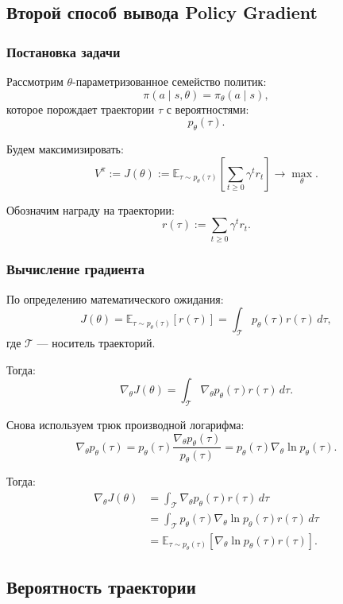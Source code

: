 \documentclass[12pt,a4paper]{article}
\begin{document}
\subsection{Второй способ вывода Policy Gradient}

\subsubsection{Постановка задачи}

Рассмотрим $\theta$-параметризованное семейство политик:
\[
\pi(a\mid s,\theta)
=
\pi_\theta(a\mid s),
\]
которое порождает траектории $\tau$ с вероятностями:
\[
p_\theta(\tau).
\]

Будем максимизировать:
\[
V^\pi
:=
J(\theta)
:=
\mathbb E_{\tau\sim p_\theta(\tau)}
\left[
\sum_{t\ge 0}
\gamma^t r_t
\right]
\to
\max_\theta.
\]

Обозначим награду на траектории:
\[
r(\tau)
:=
\sum_{t\ge 0}
\gamma^t r_t.
\]

\subsubsection{Вычисление градиента}

По определению математического ожидания:
\[
J(\theta)
=
\mathbb E_{\tau\sim p_\theta(\tau)}
\left[
r(\tau)
\right]
=
\int_{\mathcal T}
p_\theta(\tau)
r(\tau)
\,d\tau,
\]
где $\mathcal T$ --- носитель траекторий.

Тогда:
\[
\nabla_\theta J(\theta)
=
\int_{\mathcal T}
\nabla_\theta p_\theta(\tau)
r(\tau)
\,d\tau.
\]

Снова используем трюк производной логарифма:
\[
\nabla_\theta p_\theta(\tau)
=
p_\theta(\tau)
\frac{\nabla_\theta p_\theta(\tau)}
{p_\theta(\tau)}
=
p_\theta(\tau)
\nabla_\theta
\ln p_\theta(\tau).
\]

Тогда:
\[
\begin{aligned}
\nabla_\theta J(\theta)
&=
\int_{\mathcal T}
\nabla_\theta p_\theta(\tau)
r(\tau)
\,d\tau
\\
&=
\int_{\mathcal T}
p_\theta(\tau)
\nabla_\theta
\ln p_\theta(\tau)
r(\tau)
\,d\tau
\\
&=
\mathbb E_{\tau\sim p_\theta(\tau)}
\left[
\nabla_\theta
\ln p_\theta(\tau)
r(\tau)
\right].
\end{aligned}
\]

\subsection{Вероятность траектории}
\end{document}
